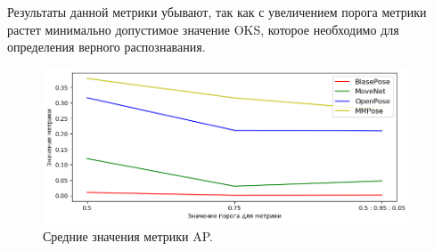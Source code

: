 Результаты данной метрики убывают, так как с увеличением порога метрики растет минимально допустимое значение OKS, которое необходимо для определения верного распознавания.

\begin{figure}[h]
	\centering
   \includegraphics[width=0.97\textwidth]{./images/results/AP}
   \caption{Средние значения метрики AP.}
   \label{fig:results_ap}
\end{figure}


\newpage
